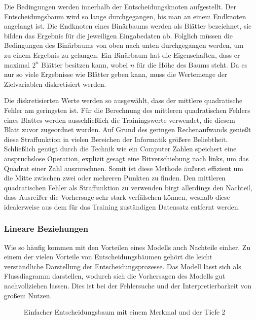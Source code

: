 \documentclass[12pt, a4paper]{article}
\begin{document}
Die Bedingungen werden innerhalb der Entscheidungsknoten aufgestellt. Der Entscheidungsbaum wird so lange durchgegangen, bis man an einem Endknoten angelangt ist. Die Endknoten eines Binärbaums werden als Blätter bezeichnet, sie bilden das Ergebnis für die jeweiligen Eingabedaten ab. Folglich müssen die Bedingungen des Binärbaums von oben nach unten durchgegangen werden, um zu einem Ergebnis zu gelangen. Ein Binärbaum hat die Eigenschaften, dass er maximal $2^{n}$ Blätter besitzen kann, wobei $n$ für die Höhe des Baums steht. Da es nur so viele Ergebnisse wie Blätter geben kann, muss die Wertemenge der Zielvariablen diskretisiert werden. 

Die diskretisierten Werte werden so ausgewählt, dass der mittlere quadratische Fehler am geringsten ist. Für die Berechnung des mittleren quadratischen Fehlers eines Blattes werden ausschließlich die Trainingswerte verwendet, die diesem Blatt zuvor zugeordnet wurden. Auf Grund des geringen Rechenaufwands genießt diese Straffunktion in vielen Bereichen der Informatik größere Beliebtheit. Schließlich genügt durch die Technik wie ein Computer Zahlen speichert eine anspruchslose Operation, explizit gesagt eine Bitverschiebung nach links, um das Quadrat einer Zahl auszurechnen. Somit ist diese Methode äußerst effizient um die Mitte zwischen zwei oder mehreren Punkten zu finden. Den mittleren quadratischen Fehler als Straffunktion zu verwenden birgt allerdings den Nachteil, dass Ausreißer die Vorhersage sehr stark verfälschen können, weshalb diese idealerweise aus dem für das Training zuständigen Datensatz entfernt werden.



\subsubsection{Lineare Beziehungen}

Wie so häufig kommen mit den Vorteilen eines Modells auch Nachteile einher. Zu einem der vielen Vorteile von Entscheidungsbäumen gehört die leicht verständliche Darstellung der Entscheidungsprozesse. Das Modell lässt sich als Flussdiagramm darstellen, wodurch sich die Vorhersagen des Modells gut nachvollziehen lassen. Dies ist bei der Fehlersuche und der Interpretierbarkeit von großem Nutzen.

\begin{figure}
\centering
\def\svgwidth{350pt}

\caption{Einfacher Entscheidungsbaum mit einem Merkmal und der Tiefe 2}
\label{fig:decisiontree_linear}
\end {figure}
\end{document}
